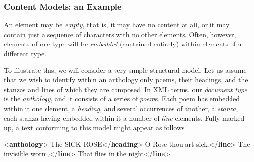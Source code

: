 \subsubsection[{Content Models: an Example}]{Content Models: an Example}\label{SG132}\par
An element may be \textit{empty}, that is, it may have no content at all, or it may contain just a sequence of characters with no other elements. Often, however, elements of one type will be \textit{embedded} (contained entirely) within elements of a different type.\par
To illustrate this, we will consider a very simple structural model. Let us assume that we wish to identify within an anthology only poems, their headings, and the stanzas and lines of which they are composed. In XML terms, our \textit{document type} is the \textit{anthology}, and it consists of a series of \textit{poem}s. Each poem has embedded within it one element, a \textit{heading}, and several occurrences of another, a \textit{stanza}, each stanza having embedded within it a number of \textit{line} elements. Fully marked up, a text conforming to this model might appear as follows: \par\bgroup\exampleFont \begin{shaded}\noindent\mbox{}{<\textbf{anthology}>}\mbox{}\newline 
{}\mbox{}\newline 
\hspace*{1em}The SICK ROSE{</\textbf{heading}>}\mbox{}\newline 
\hspace*{1em}\mbox{}\newline 
\hspace*{1em}\hspace*{1em}O Rose thou art sick.{</\textbf{line}>}\mbox{}\newline 
\hspace*{1em}\hspace*{1em}The invisible worm,{</\textbf{line}>}\mbox{}\newline 
\hspace*{1em}\hspace*{1em}That flies in the night{</\textbf{line}>}\mbox{}\newline 

\end{shaded}

